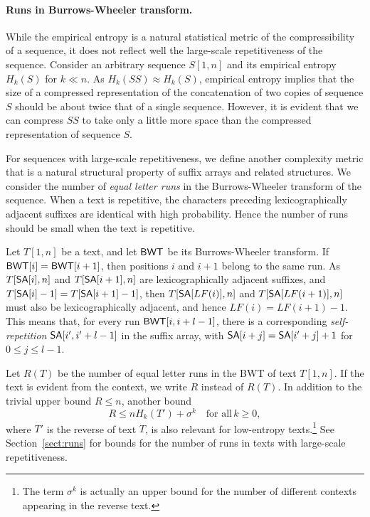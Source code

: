 \paragraph{Runs in Burrows-Wheeler transform.}

While the empirical entropy is a natural statistical metric of the compressibility of a sequence, it does not reflect well the large-scale repetitiveness of the sequence. Consider an arbitrary sequence $S[1,n]$ and its  empirical entropy $H_{k}(S)$ for $k \ll n$. As $H_{k}(SS) \approx H_{k}(S)$, empirical entropy implies that the size of a compressed representation of the concatenation of two copies of sequence $S$ should be about twice that of a single sequence. However, it is evident that we can compress $SS$ to take only a little more space than the compressed representation of sequence $S$.

For sequences with large-scale repetitiveness, we define another complexity metric that is a natural structural property of suffix arrays and related structures. We consider the number of \emph{equal letter runs} in the Burrows-Wheeler transform of the sequence. When a text is repetitive, the characters preceding lexicographically adjacent suffixes are identical with high probability. Hence the number of runs should be small when the text is repetitive.

Let $T[1,n]$ be a text, and let $\mathsf{BWT}$ be its Burrows-Wheeler transform. If $\mathsf{BWT}[i] = \mathsf{BWT}[i+1]$, then positions $i$ and $i+1$ belong to the same run. As $T[\mathsf{SA}[i],n]$ and $T[\mathsf{SA}[i+1],n]$ are lexicographically adjacent suffixes, and $T[\mathsf{SA}[i]-1] = T[\mathsf{SA}[i+1]-1]$, then $T[\mathsf{SA}[LF(i)],n]$ and $T[\mathsf{SA}[LF(i+1)],n]$ must also be lexicographically adjacent, and hence $LF(i) = LF(i+1) - 1$. This means that, for every run $\mathsf{BWT}[i, i+l-1]$, there is a corresponding \emph{self-repetition} $\mathsf{SA}[i', i'+l-1]$ in the suffix array, with $\mathsf{SA}[i+j] = \mathsf{SA}[i'+j]+1$ for $0 \le j \le l-1$.

Let $R(T)$ be the number of equal letter runs in the BWT of text $T[1,n]$. If the text is evident from the context, we write $R$ instead of $R(T)$. In addition to the trivial upper bound $R \le n$, another bound \cite{Maekinen2005}
$$
R \le n H_{k}(T') + \sigma^{k} \quad \textrm{for all} \, k \ge 0,
$$
where $T'$ is the reverse of text $T$, is also relevant for low-entropy texts.\footnote{The term $\sigma^{k}$ is actually an upper bound for the number of different  contexts appearing in the reverse text.} See Section~\ref{sect:runs} for bounds for the number of runs in texts with large-scale repetitiveness.

